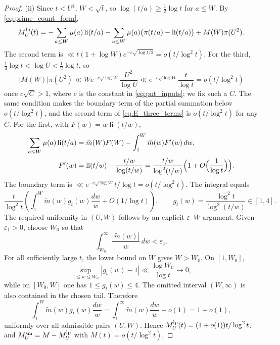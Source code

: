 \documentclass[11pt,reqno]{amsart}
\numberwithin{equation}{section}
\theoremstyle{plain}
\theoremstyle{definition}
\theoremstyle{remark}
\DeclareMathOperator{\li}{li}
\newcommand{\mt}{\widetilde{m}}
\begin{document}
\begin{proof}
(ii) Since $t<U^4$, $W<\sqrt t$, so $\log(t/a)\ge\frac12\log t$ for $a\le W$.
By \eqref{eq:prime_count_form},
\begin{equation}
\label{eq:E_three_terms}
  M^{\rm lp}_U(t)=-\sum_{a\le W}\mu(a)\li(t/a)
  -\sum_{a\le W}\mu(a)\bigl(\pi(t/a)-\li(t/a)\bigr)+M(W)\pi(U^2).
\end{equation}
The second term is $\ll t(1+\log W)e^{-c\sqrt{\log t/2}}=o(t/\log^2t)$. For
the third, $\tfrac14\log t<\log U<\tfrac12\log t$, so
\begin{equation}
|M(W)|\pi(U^2)\ll We^{-c\sqrt{\log W}}\frac{U^2}{\log U}
\ll e^{-c\sqrt{\log W}}\frac{t}{\log t}=o(t/\log^2t)
\end{equation}
once $c\sqrt C>1$, where $c$ is the constant in \eqref{eq:pnt_inputs};
we fix such a $C$. The same condition makes the boundary term of the partial
summation below $o(t/\log^2t)$, and the second term of
\eqref{eq:E_three_terms} is $o(t/\log^2t)$ for any $C$. For the first, with $F(w)=w\li(t/w)$,
\begin{align}
\label{eq:partial_summation_li}
  \sum_{a\le W}\mu(a)\li(t/a)
  &=\mt(W)F(W)-\int_1^W\mt(w)F'(w)\,dw,\\
  F'(w)&=\li(t/w)-\frac{t/w}{\log(t/w)}
  =\frac{t/w}{\log^2(t/w)}\Bigl(1+O\Bigl(\frac1{\log t}\Bigr)\Bigr).
\end{align}
The boundary term is $\ll e^{-c\sqrt{\log W}}t/\log t=o(t/\log^2t)$. The
integral equals
\begin{equation}
\frac t{\log^2t}\left(\int_1^W\mt(w)g_t(w)\frac{dw}w+O(1/\log t)\right),
\qquad
g_t(w)=\frac{\log^2t}{\log^2(t/w)}\in[1,4].
\end{equation}
The required uniformity in $(U,W)$ follows by an explicit
$\varepsilon$--$W$ argument.  Given $\varepsilon_1>0$, choose $W_0$ so that
\begin{equation}
 \int_{W_0}^\infty\frac{|\mt(w)|}{w}\,dw<\varepsilon_1.
\end{equation}
For all sufficiently large $t$, the lower bound on $W$ gives $W>W_0$.  On
$[1,W_0]$,
\begin{equation}
 \sup_{1\le w\le W_0}|g_t(w)-1|\ll\frac{\log W_0}{\log t}\to0,
\end{equation}
while on $[W_0,W]$ one has $1\le g_t(w)\le4$.  The omitted interval
$(W,\infty)$ is also contained in the chosen tail.  Therefore
\begin{equation}
 \int_1^W\mt(w)g_t(w)\frac{dw}{w}
 =\int_1^\infty\mt(w)\frac{dw}{w}+o(1)=1+o(1),
\end{equation}
uniformly over all admissible pairs $(U,W)$. Hence
$M^{\rm lp}_U(t)=(1+o(1))t/\log^2t$, and $M^{\rm sm}_U=M-M^{\rm lp}_U$ with $M(t)=o(t/\log^2t)$.
\end{proof}
\end{document}
